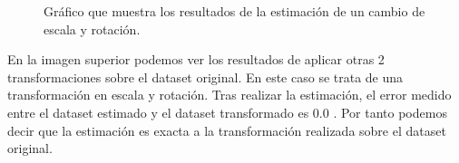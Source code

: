 \begin{figure}[H]
\begin{center}
\hspace{0.5cm}

\end{center}

\caption{Gráfico que muestra los resultados de la estimación de un cambio de escala y rotación.}
\end{figure}
En la imagen superior podemos ver los resultados de aplicar otras 2 transformaciones sobre el dataset original. En este caso se trata de una transformación en escala y rotación.
Tras realizar la estimación, el error medido entre el dataset estimado y el dataset transformado es 0.0 . Por tanto podemos decir que la estimación es exacta a la transformación realizada sobre el dataset original.

